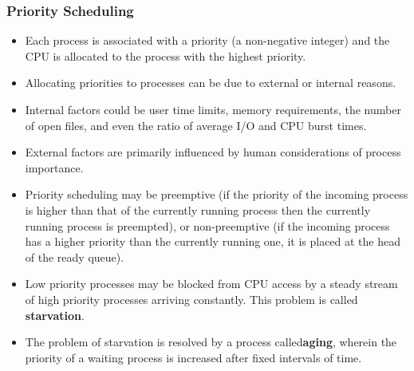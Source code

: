 \documentclass{article}
\theoremstyle{plain}
\theoremstyle{definition}
\begin{document}
\subsubsection{Priority Scheduling}
\begin{itemize}
    \item Each process is associated with a priority (a non-negative integer) and the CPU is allocated to the process with the highest priority.
    
    \item Allocating priorities to processes can be due to external or internal reasons. 
    
    \item Internal factors could be user time limits, memory requirements, the number of open files, and even the ratio of average I/O and CPU burst times. 
    
    \item External factors are primarily influenced by human considerations of process importance. 
    
    \item Priority scheduling may be preemptive (if the priority of the incoming process is higher than that of the currently running process then the currently running process is preempted), or non-preemptive (if the incoming process has a higher priority than the currently running one, it is placed at the head of the ready queue).
    
    \item Low priority processes may be blocked from CPU access by a steady stream of high priority processes arriving constantly. This problem is called \textbf{starvation}.
    
    \item The problem of starvation is resolved by a process called\textbf{aging}, wherein the priority of a waiting process is increased after fixed intervals of time. 
\end{itemize}
\end{document}
